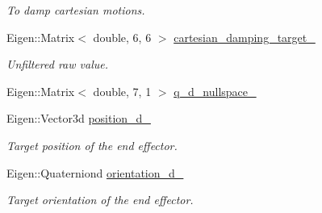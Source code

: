 \begin{DoxyCompactItemize}
\begin{DoxyCompactList}\small\item\em To damp cartesian motions. \end{DoxyCompactList}\item 
\mbox{\label{structfranka__example__controllers_1_1_franka_data_container_a8683ac01d87d426cb44fb92b8ddac566}} 
Eigen\+::\+Matrix$<$ double, 6, 6 $>$ \hyperlink{structfranka__example__controllers_1_1_franka_data_container_a8683ac01d87d426cb44fb92b8ddac566}{cartesian\+\_\+damping\+\_\+target\+\_\+}
\begin{DoxyCompactList}\small\item\em Unfiltered raw value. \end{DoxyCompactList}\item 
Eigen\+::\+Matrix$<$ double, 7, 1 $>$ \hyperlink{structfranka__example__controllers_1_1_franka_data_container_a5bbc2de05ad876eff5c2aadc0094eca1}{q\+\_\+d\+\_\+nullspace\+\_\+}
\item 
\mbox{\label{structfranka__example__controllers_1_1_franka_data_container_a428d7240d8e2c000d729c4daacbcf1eb}} 
Eigen\+::\+Vector3d \hyperlink{structfranka__example__controllers_1_1_franka_data_container_a428d7240d8e2c000d729c4daacbcf1eb}{position\+\_\+d\+\_\+}
\begin{DoxyCompactList}\small\item\em Target position of the end effector. \end{DoxyCompactList}\item 
\mbox{\label{structfranka__example__controllers_1_1_franka_data_container_a39702becda74447804beac8958455fd2}} 
Eigen\+::\+Quaterniond \hyperlink{structfranka__example__controllers_1_1_franka_data_container_a39702becda74447804beac8958455fd2}{orientation\+\_\+d\+\_\+}
\begin{DoxyCompactList}\small\item\em Target orientation of the end effector. \end{DoxyCompactList}\item 
\mbox{\label{structfranka__example__controllers_1_1_franka_data_container_a7ef83945560a2b6cf9633fee007c7144}} 

\end{DoxyCompactItemize}
